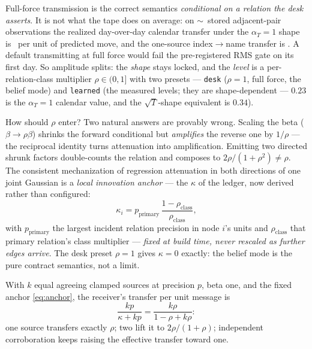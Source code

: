 \documentclass[11pt]{article}
\begin{document}
Full-force transmission is the correct semantics \emph{conditional on a
relation the desk asserts}.  It is not what the tape does on average: on
$\sim$\gtpcalpairs\ stored adjacent-pair observations the realized
day-over-day calendar transfer under the $\alpha_T=1$ shape is
\gtpcallevel\ per unit of predicted move, and the one-source
index$\to$name transfer is \gtprhoindex.  A default transmitting at full
force would fail the pre-registered RMS gate on its first day.  So
amplitude splits: the \emph{shape} stays locked, and the \emph{level} is a
per-relation-class multiplier $\rho\in(0,1]$ with two presets ---
\texttt{desk} ($\rho=1$, full force, the belief mode) and \texttt{learned}
(the measured levels; they are shape-dependent --- $0.23$ is the
$\alpha_T{=}1$ calendar value, and the $\sqrt T$-shape equivalent is
$0.34$).

How should $\rho$ enter?  Two natural answers are provably wrong.  Scaling
the beta ($\beta\to\rho\beta$) shrinks the forward conditional but
\emph{amplifies} the reverse one by $1/\rho$ --- the reciprocal identity
turns attenuation into amplification.  Emitting two directed shrunk
factors double-counts the relation and composes to
$2\rho/(1+\rho^2)\neq\rho$.  The consistent mechanization of regression
attenuation in both directions of one joint Gaussian is a \emph{local
innovation anchor} --- the $\kappa$ of the ledger, now derived rather than
configured:
\begin{equation}
\kappa_i=p_{\mathrm{primary}}\,\frac{1-\rho_{\mathrm{class}}}
{\rho_{\mathrm{class}}},
\label{eq:anchor}
\end{equation}
with $p_{\mathrm{primary}}$ the largest incident relation precision in
node $i$'s units and $\rho_{\mathrm{class}}$ that primary relation's class
multiplier --- \emph{fixed at build time, never rescaled as further edges
arrive}.  The desk preset $\rho=1$ gives $\kappa=0$ exactly: the belief
mode is the pure contract semantics, not a limit.

\begin{proposition}
\label{prop:corroboration}
With $k$ equal agreeing clamped sources at precision $p$, beta one, and
the fixed anchor \eqref{eq:anchor}, the receiver's transfer per unit
message is
\[
\frac{kp}{\kappa+kp}=\frac{k\rho}{1-\rho+k\rho}:
\]
one source transfers exactly $\rho$; two lift it to $2\rho/(1+\rho)$;
independent corroboration keeps raising the effective transfer toward one.
\end{proposition}
\end{document}
